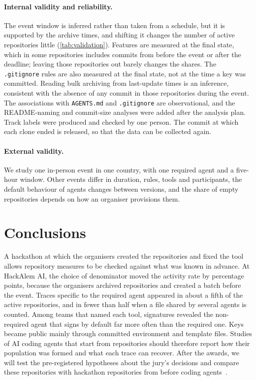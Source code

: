 \documentclass{article}
\begin{document}
\paragraph{Internal validity and reliability.} The event window is inferred rather than taken from a schedule, but it is supported by the archive times, and shifting it changes the number of active repositories little (\cref{tab:validation}). Features are measured at the final state, which in some repositories includes commits from before the event or after the deadline; leaving those repositories out barely changes the shares. The \texttt{.gitignore} rules are also measured at the final state, not at the time a key was committed. Reading bulk archiving from last-update times is an inference, consistent with the absence of any commit in those repositories during the event. The associations with \texttt{AGENTS.md} and \texttt{.gitignore} are observational, and the README-naming and commit-size analyses were added after the analysis plan. Track labels were produced and checked by one person. The commit at which each clone ended is released, so that the data can be collected again.

\paragraph{External validity.} We study one in-person event in one country, with one required agent and a five-hour window. Other events differ in duration, rules, tools and participants, the default behaviour of agents changes between versions, and the share of empty repositories depends on how an organiser provisions them.

\section{Conclusions}\label{sec:conclusion}

A hackathon at which the organisers created the repositories and fixed the tool allows repository measures to be checked against what was known in advance. At HackAlem AI, the choice of denominator moved the activity rate by \NRqOneActiveGapPp{} percentage points, because the organisers archived repositories and created a batch before the event. Traces specific to the required agent appeared in about a fifth of the active repositories, and in fewer than half when a file shared by several agents is counted. Among teams that named each tool, signatures revealed the non-required agent that signs by default far more often than the required one. Keys became public mainly through committed environment and template files. Studies of AI coding agents that start from repositories should therefore report how their population was formed and what each trace can recover. After the awards, we will test the pre-registered hypotheses about the jury's decisions and compare these repositories with hackathon repositories from before coding agents~\cite{halmans2026hackrep}.
\end{document}
